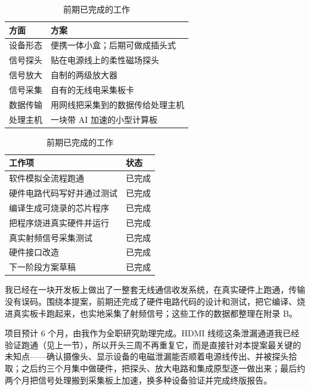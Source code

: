 \documentclass[a4paper,11pt,oneside,UTF8,scheme=plain]{ctexart}
\begin{document}
\begin{table}[H]
\begin{minipage}[t]{0.49\textwidth}
\centering
\caption{六项核心方案（简明版）}
\label{tab:plan-overview}
\footnotesize
\begin{tabularx}{\textwidth}{l>{\raggedright\arraybackslash}X}
\toprule
\rowcolor{tableheader} \textbf{方面} & \textbf{方案} \\
\midrule
设备形态 & 便携一体小盒；后期可做成插头式 \\
信号探头 & 贴在电源线上的柔性磁场探头 \\
信号放大 & 自制的两级放大器 \\
信号采集 & 自有的无线电采集板卡 \\
数据传输 & 用网线把采集到的数据传给处理主机 \\
处理主机 & 一块带 AI 加速的小型计算板 \\
\bottomrule
\end{tabularx}
\end{minipage}
\hfill
\begin{minipage}[t]{0.49\textwidth}
\centering
\caption{前期已完成的工作}
\label{tab:prephase0-summary}
\footnotesize
\begin{tabularx}{\textwidth}{>{\raggedright\arraybackslash}Xl}
\toprule
\rowcolor{tableheader} \textbf{工作项} & \textbf{状态} \\
\midrule
软件模拟全流程跑通 & 已完成 \\
硬件电路代码写好并通过测试 & 已完成 \\
编译生成可烧录的芯片程序 & 已完成 \\
把程序烧进真实硬件并运行 & 已完成 \\
真实射频信号采集测试 & 已完成 \\
硬件接口改造 & 已完成 \\
下一阶段方案草稿 & 已完成 \\
\bottomrule
\end{tabularx}
\end{minipage}
\end{table}

我已经在一块开发板上做出了一整套无线通信收发系统，在真实硬件上跑通，传输没有误码。围绕本提案，前期还完成了硬件电路代码的设计和测试，把它编译、烧进真实板卡跑起来，也实地采集了射频信号；这些工作的数据都整理在附录 B。

项目预计 6 个月，由我作为全职研究助理完成。HDMI 线缆这条泄漏通道我已经验证跑通（见上一节），所以开头三周不再重复它，而是直接针对本提案最关键的未知点——确认摄像头、显示设备的电磁泄漏能否顺着电源线传出、并被探头拾取；之后约三个月集中做硬件，把探头、放大电路和集成原型逐一做出来；最后约两个月把信号处理搬到采集板上加速，换多种设备验证并完成终版报告。
\end{document}
